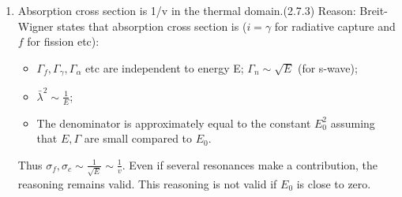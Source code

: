 \documentclass{school-22.211-notes}
\begin{document}
\begin{enumerate}
\item Absorption cross section is 1/v in the thermal domain.(2.7.3) Reason: Breit-Wigner states that absorption cross section is ($i = \gamma$ for radiative capture and $f$ for fission etc):
  \begin{itemize}
  \item $\Gamma_f, \Gamma_{\gamma}, \Gamma_{\alpha}$ etc are independent to energy E; $\Gamma_n \sim \sqrt{E}$ (for s-wave);
  \item $\bar{\lambda}^2 \sim \frac{1}{E}$;
  \item The denominator is approximately equal to the constant $E_0^2$ assuming that $E, \Gamma$ are small compared to $E_0$.
  \end{itemize}
  Thus $\sigma_f, \sigma_c \sim \frac{1}{\sqrt{E}} \sim \frac{1}{v}$. Even if several resonances make a contribution, the reasoning remains valid. This reasoning is not valid if $E_0$ is close to zero. 
\end{enumerate}
\end{document}
